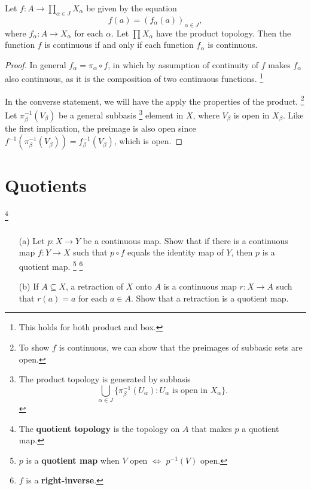 \documentclass[../main.tex]{subfiles}
\begin{document}
\begin{problem}[Theorem 19.6]
    Let $f : A \to \prod_{\alpha \in J} X_\alpha$ be given by the equation
    \begin{equation}
        f(a) = (f_\alpha(a))_{\alpha \in J},
    \end{equation}
    where $f_\alpha : A \to X_\alpha$ for each $\alpha$.
    Let $\prod X_\alpha$ have the product topology.
    Then the function $f$ is continuous if and only if each function $f_\alpha$ is continuous.
\end{problem}

\begin{proof}
    In general $f_\alpha = \pi_\alpha \circ f$, in which by assumption of continuity of $f$ makes $f_\alpha$ also continuous, as it is the composition of two continuous functions.
    \footnote{This holds for both product and box.}

    In the converse statement, we will have the apply the properties of the product.
    \footnote{To show $f$ is continuous, we can show that the preimages of subbasic sets are open.}
    Let $\pi_\beta^{-1}(V_\beta)$ be a general subbasis
    \footnote{The product topology is generated by subbasis
        \begin{equation*}
            \bigcup_{\alpha \in J} \{ \pi_\beta^{-1}(U_\alpha) : U_\alpha \text{ is open in } X_\alpha \}.
        \end{equation*}
    }
    element in $X$,
    where $V_\beta$ is open in $X_\beta$.
    Like the first implication, the preimage is also open since
    $f^{-1}(\pi_\beta^{-1}(V_\beta)) = f_\beta^{-1}(V_\beta)$, which is open.
\end{proof}

\section{Quotients}

\footnote{The \textbf{quotient topology} is the topology on $A$ that makes $p$ a quotient map.}


\begin{problem}[\S22 Ex. 2]
$ $
\begin{itemize}
    \item[(a)]
        Let $p: X \to Y$ be a continuous map.
        Show that if there is a continuous map $f : Y \to X$ such that $p \circ f$ equals the identity map of $Y$, then $p$ is a quotient map.
        \footnote{$p$ is a \textbf{quotient map} when $V$ open $\Leftrightarrow$ $p^{-1}(V)$ open.}
        \footnote{$f$ is a \textbf{right-inverse}.}

    \item[(b)]
        If $A \subseteq X$, a retraction of $X$ onto $A$ is a continuous map $r : X \to A$ such that $r(a) = a$ for each $a \in A$.
        Show that a retraction is a quotient map.
\end{itemize}
\end{problem}
\end{document}
